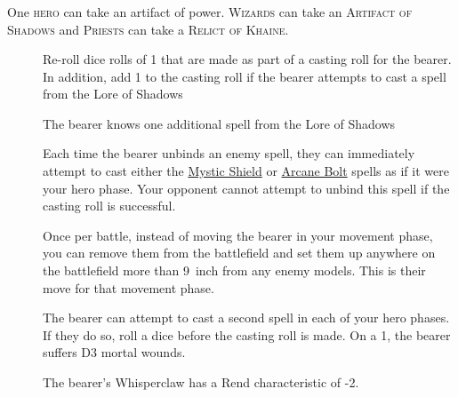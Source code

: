 \subsubsection{} One
\textsc{hero} can take an artifact of power. \textsc{Wizards} can take an
\textsc{Artifact of Shadows} and \textsc{Priests} can take a \textsc{Relict of
Khaine}.
\begin{description} 
    \item [] Re-roll dice rolls of 1 that
        are made as part of a casting roll for the bearer. In addition, add
        1 to the casting roll if the bearer attempts to cast a spell from the
        Lore of Shadows
    \item [] The bearer knows one
        additional spell from the Lore of Shadows 
    \item [] Each time the bearer
        unbinds an enemy spell, they can immediately attempt to cast either the
        \hyperref[mystic-shield]{Mystic Shield} or
        \hyperref[arcane-bolt]{Arcane Bolt} spells as if it were your hero
        phase. Your opponent cannot attempt to unbind this spell if the casting
        roll is
        successful.
    \item [] Once per battle,
        instead of moving the bearer in your movement phase, you can remove
        them from the battlefield and set them up anywhere on the battlefield
        more than 9~inch from any enemy models. This is their move for that
        movement phase.
    \item [] The bearer can attempt to
        cast a second spell in each of your hero phases. If they do so, roll
        a dice before the casting roll is made. On a 1, the bearer suffers D3
        mortal wounds.
    \item [] The bearer’s Whisperclaw has
        a Rend characteristic of -2.
\end{description} 

